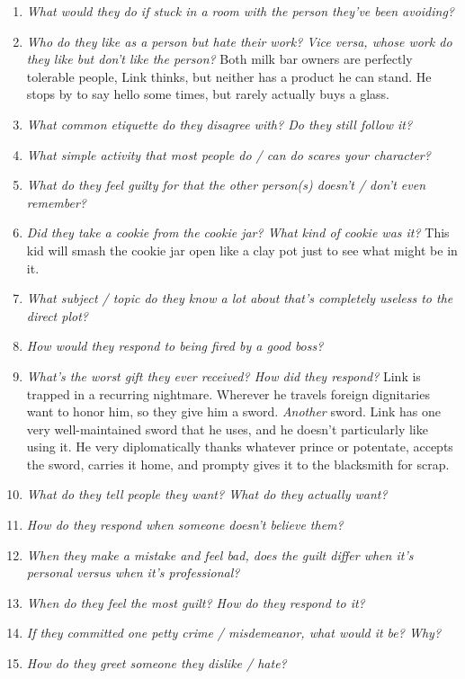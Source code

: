 \begin{enumerate}
    \item\textit{What would they do if stuck in a room with the person they’ve been avoiding?}
    \item\textit{Who do they like as a person but hate their work? Vice versa, whose work do they like but don’t like the person?} Both milk bar owners are perfectly tolerable people, Link thinks, but neither has a product he can stand. He stops by to say hello some times, but rarely actually buys a glass.
    \item\textit{What common etiquette do they disagree with? Do they still follow it?} 
    \item\textit{What simple activity that most people do / can do scares your character?}
    \item\textit{What do they feel guilty for that the other person(s) doesn’t / don’t even remember?}
    \item\textit{Did they take a cookie from the cookie jar? What kind of cookie was it?} This kid will smash the cookie jar open like a clay pot just to see what might be in it.
    \item\textit{What subject / topic do they know a lot about that’s completely useless to the direct plot?}
    \item\textit{How would they respond to being fired by a good boss?}
    \item\textit{What’s the worst gift they ever received? How did they respond?} Link is trapped in a recurring nightmare. Wherever he travels foreign dignitaries want to honor him, so they give him a sword. \emph{Another} sword. Link has one very well-maintained sword that he uses, and he doesn't particularly like using it. He very diplomatically thanks whatever prince or potentate, accepts the sword, carries it home, and prompty gives it to the blacksmith for scrap.
    \item\textit{What do they tell people they want? What do they actually want?} 
    \item\textit{How do they respond when someone doesn’t believe them?}
    \item\textit{When they make a mistake and feel bad, does the guilt differ when it’s personal versus when it’s professional?}
    \item\textit{When do they feel the most guilt? How do they respond to it?}
    \item\textit{If they committed one petty crime / misdemeanor, what would it be? Why?} 
    \item\textit{How do they greet someone they dislike / hate?}

\end{enumerate}
